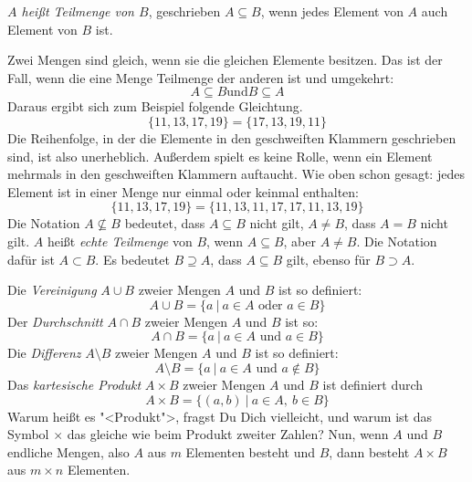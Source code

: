 \emph{$A$ heißt Teilmenge von $B$}, geschrieben $A \subseteq B$, 
wenn jedes Element von $A$ auch Element von $B$ ist.

Zwei Mengen sind gleich, wenn sie die gleichen Elemente besitzen.  Das
ist der Fall, wenn die eine Menge Teilmenge der anderen ist und umgekehrt:
%
\[A \subseteq B \text{und} B \subseteq A\]
%
Daraus ergibt sich zum Beispiel folgende Gleichtung.
%
\[\{11,13,17,19\} =\{17,13,19,11\}\]
%
Die Reihenfolge, in der die Elemente in den geschweiften Klammern
geschrieben sind, ist also unerheblich.  Außerdem spielt es keine
Rolle, wenn ein Element mehrmals in den geschweiften Klammern
auftaucht.  Wie oben schon gesagt: jedes Element ist in einer Menge
nur einmal oder keinmal enthalten:
\[\{11,13,17,19\} = \{11,13,11,17,17,11,13,19\}\]
%
Die Notation $A \not \subseteq B$ bedeutet, dass $A \subseteq B$ nicht gilt, $A
\not = B$, dass $A = B$ nicht gilt. $A$ heißt \emph{echte Teilmenge} von $B$,
wenn $A \subseteq B$, aber $A \not = B$. Die Notation dafür ist $A \subset B$.
Es bedeutet $B \supseteq A$, dass $A \subseteq B$ gilt, ebenso für
$B \supset A$. 

Die \emph{Vereinigung} $A \cup B$ 
zweier Mengen $A$ und $B$ ist so definiert:
\[A \cup B  = \{a\ |\ a \in A \text{ oder } a \in B\}\]
%
Der \emph{Durchschnitt} $A \cap B$ 
zweier Mengen $A$ und $B$ ist so: 
\[A \cap B = \{a\ |\ a \in A \text{ und } a \in B\}\]
%
Die \emph{Differenz} $A \setminus B$ 
zweier Mengen $A$ und $B$ ist so definiert:
\[A \setminus B = \{a\ |\ a \in A \text{ und } a \not \in B\}\]
%
Das \emph{kartesische Produkt} 
  $A \times B$ zweier Mengen 
$A$ und $B$ ist definiert durch
\[ A \times B = \{(a,b)\ |\ a \in A,\ b \in B\}\]
%
Warum heißt es "<Produkt">, fragst Du Dich vielleicht, und warum ist
das Symbol $\times$ das gleiche wie beim Produkt zweiter Zahlen? Nun,
wenn $A$ und $B$ endliche Mengen, also $A$ aus $m$ Elementen besteht
und $B$, dann besteht $A\times B$ aus $m\times n$ Elementen.



